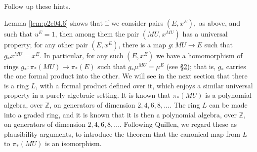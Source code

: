 \documentclass[../main]{subfiles}
\begin{document}
\begin{exercise}
Follow up these hints.
\end{exercise}

Lemma \ref{lem:p2c04.6} shows that if we consider pairs $(E,x^E),$ as above, and such that $u^E=1$, then among them the pair $(MU,x^{MU})$ has a universal property; for any other pair $(E,x^E)$, there is a map $g:MU\longrightarrow E$ such that $g_\ast x^{MU}=x^E$. In particular, for any such $(E,x^E)$ we have a homomorphism of rings $g_\ast:\pi_\ast(MU)\longrightarrow \pi_\ast(E)$ such that $g_\ast\mu^{MU}=\mu^E$ (see \hyperref[sec:p2c2]{\S 2}); that is, $g_\ast$ carries the one formal product into the other. We will see in the next section that there is a ring $L$, with a formal product defined over it, which enjoys a similar universal property in a purely algebraic setting. It is known that $\pi_\ast(MU)$ is a polynomial algebra, over $\mathbb{Z}$, on generators of dimension $2,4,6,8,...$. The ring $L$ can be made into a graded ring, and it is known that it is then a polynomial algebra, over $\mathbb{Z}$, on generators of dimension $2,4,6,8,...$. Following Quillen, we regard these as plausibility arguments, to introduce the theorem that the canonical map from $L$ to $\pi_\ast(MU)$ is an isomorphism.
\end{document}
